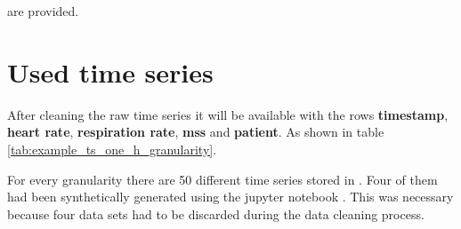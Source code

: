 are provided.



\section{Used time series}
After cleaning the raw time series it will be available with the rows \textbf{timestamp}, \textbf{heart rate}, \textbf{respiration rate}, \textbf{mss} and \textbf{patient}. As shown in table \ref{tab:example_ts_one_h_granularity}.


\begin{table}[h!]
\centering
{}
\caption{Example One hour granularity data}
\label{tab:example_ts_one_h_granularity}
\end{table}

For every granularity there are 50 different time series stored in . Four of them had been synthetically generated using the jupyter notebook . This was necessary because four data sets had to be discarded during the data cleaning process.
